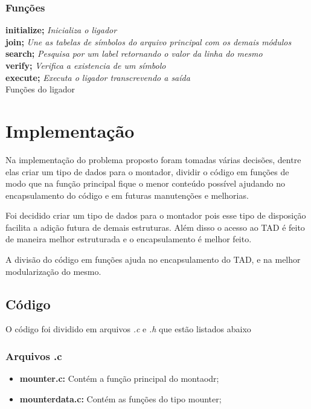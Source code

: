 \documentclass[12pt]{article}
\begin{document}
\subsubsection{Funções}
\begin{algorithm}[h!]
\begin{footnotesize}
   \textbf{initialize;} \textit{Inicializa o ligador} \\
   \textbf{join;} \textit{Une as tabelas de símbolos do arquivo principal com
   os demais módulos}
   \\
   \textbf{search;} \textit{Pesquisa por um label retornando o valor da linha
   do mesmo}
   \\
   \textbf{verify;} \textit{Verifica a existencia de um símbolo}
   \\
   \textbf{execute;} \textit{Executa o ligador transcrevendo a saída} \\
\caption{Funções do ligador}
\end{footnotesize}
\end{algorithm}


\section{Implementação}
\label{implementacao}
Na implementação do problema proposto foram tomadas várias decisões, dentre
elas criar um tipo de dados para o montador, dividir o código em funções
de modo que na função principal fique o menor conteúdo possível ajudando no
encapsulamento do código e em futuras manutenções e melhorias.

Foi decidido criar um tipo de dados para o montador pois esse tipo de
disposição facilita a adição futura de demais estruturas.
Além disso o acesso ao TAD é feito de maneira melhor estruturada e o
encapsulamento é melhor feito.

A divisão do código em funções ajuda no encapsulamento do TAD, e na melhor
modularização do mesmo.

\subsection{Código}
O código foi dividido em arquivos \textit{.c} e \textit{.h} que estão listados
abaixo

\subsubsection{Arquivos .c}
\begin{itemize}
\item \textbf{mounter.c:} Contém a função principal do montaodr;
\item \textbf{mounterdata.c:} Contém as funções do tipo mounter;
\end{itemize}
\end{document}

